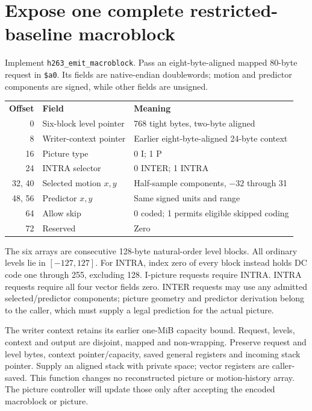 \section{Expose one complete restricted-baseline macroblock}
Implement \texttt{h263\_emit\_macroblock}. Pass an eight-byte-aligned mapped
80-byte request in \texttt{\$a0}. Its fields are native-endian doublewords;
motion and predictor components are signed, while other fields are unsigned.
\begin{center}
  \begin{tabular}{rll}
    \textbf{Offset} & \textbf{Field}          & \textbf{Meaning}                           \\
    0               & Six-block level pointer & 768 tight bytes, two-byte aligned          \\
    8               & Writer-context pointer  & Earlier eight-byte-aligned 24-byte context \\
    16              & Picture type            & 0 I; 1 P                                   \\
    24              & INTRA selector          & 0 INTER; 1 INTRA                           \\
    32, 40          & Selected motion $x,y$   & Half-sample components, $-32$ through 31   \\
    48, 56          & Predictor $x,y$         & Same signed units and range                \\
    64              & Allow skip              & 0 coded; 1 permits eligible skipped coding \\
    72              & Reserved                & Zero
  \end{tabular}
\end{center}
The six arrays are consecutive 128-byte natural-order level blocks. All ordinary
levels lie in $[-127,127]$. For INTRA, index zero of every block instead holds
DC code one through 255, excluding 128. I-picture requests require INTRA. INTRA
requests require all four vector fields zero. INTER requests may use any admitted
selected/predictor components; picture geometry and predictor derivation belong
to the caller, which must supply a legal prediction for the actual picture.

The writer context retains its earlier one-MiB capacity bound. Request, levels,
context and output are disjoint, mapped and non-wrapping. Preserve request and
level bytes, context pointer/capacity, saved general registers and incoming stack
pointer. Supply an aligned stack with private space; vector registers are
caller-saved. This function changes no reconstructed picture or motion-history
array. The picture controller will update those only after accepting the encoded
macroblock or picture.

